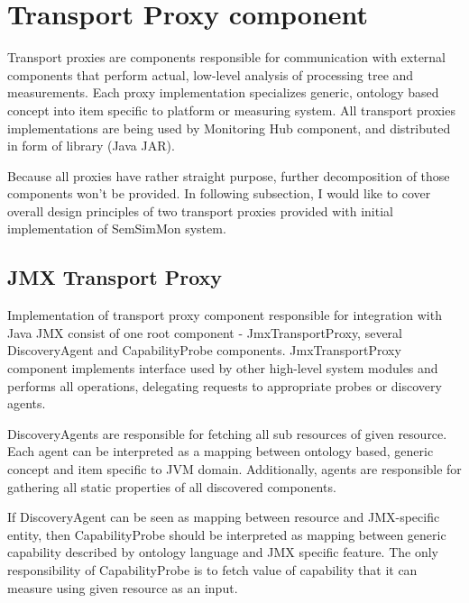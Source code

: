 %
\section{Transport Proxy component}
\label{sec:arch_tproxy}

Transport proxies are components responsible for communication with external components that perform actual, low-level analysis of processing tree and measurements. Each proxy implementation specializes generic, ontology based concept into item specific to platform or measuring system. All transport proxies implementations are being used by Monitoring Hub component, and distributed in form of library (Java JAR). 

Because all proxies have rather straight purpose, further decomposition of those components won't be provided. In following subsection, I would like to cover overall design principles of two transport proxies provided with initial implementation of SemSimMon system.

\subsection{JMX Transport Proxy}

Implementation of transport proxy component responsible for integration with Java JMX consist of one root component - JmxTransportProxy, several DiscoveryAgent and CapabilityProbe components. JmxTransportProxy component implements interface used by other high-level system modules and performs all operations, delegating requests to appropriate probes or discovery agents.

DiscoveryAgents are responsible for fetching all sub resources of given resource. Each agent can be interpreted as a mapping between ontology based, generic concept and item specific to JVM domain. Additionally, agents are responsible for gathering all static properties of all discovered components.

If DiscoveryAgent can be seen as mapping between resource and JMX-specific entity, then CapabilityProbe should be interpreted as mapping between generic capability described by ontology language and JMX specific feature. The only responsibility of CapabilityProbe is to fetch value of capability that it can measure using given resource as an input.

